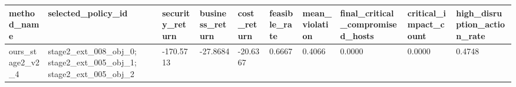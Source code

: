 \begin{tabular}{llllllllll}
\hline
method_name & selected_policy_id & security_return & business_return & cost_return & feasible_rate & mean_violation & final_critical_compromised_hosts & critical_impact_count & high_disruption_action_rate \\
\hline
ours_stage2_v2_4 & stage2_ext_008_obj_0; stage2_ext_005_obj_1; stage2_ext_005_obj_2 & -170.5713 & -27.8684 & -20.6367 & 0.6667 & 0.4066 & 0.0000 & 0.0000 & 0.4748 \\
\hline
\end{tabular}